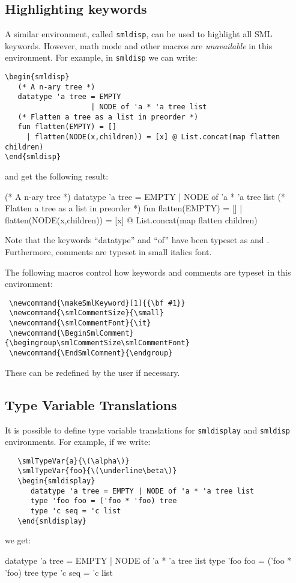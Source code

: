\documentclass{article}
\begin{document}
\subsection{Highlighting keywords}
A similar environment, called \verb|smldisp|, can be used to highlight
all SML keywords.   However, math mode and other macros are {\em unavailable}
in this environment.  For example, in \verb|smldisp| we can write:
\begin{verbatim}
\begin{smldisp} 
   (* A n-ary tree *)
   datatype 'a tree = EMPTY 
                    | NODE of 'a * 'a tree list
   (* Flatten a tree as a list in preorder *)
   fun flatten(EMPTY) = []
     | flatten(NODE(x,children)) = [x] @ List.concat(map flatten children)
\end{smldisp}
\end{verbatim}
and get the following result:
\begin{smldisp} 
   (* A n-ary tree *)
   datatype 'a tree = EMPTY 
                    | NODE of 'a * 'a tree list
   (* Flatten a tree as a list in preorder *)
   fun flatten(EMPTY) = []
     | flatten(NODE(x,children)) = [x] @ List.concat(map flatten children)
\end{smldisp}

Note that the keywords ``datatype'' and ``of'' have been typeset as
 and .  Furthermore, comments are typeset
in small italics font.   

The following macros control how keywords and comments are typeset
in this environment:
\begin{verbatim}
 \newcommand{\makeSmlKeyword}[1]{{\bf #1}}
 \newcommand{\smlCommentSize}{\small}
 \newcommand{\smlCommentFont}{\it}
 \newcommand{\BeginSmlComment}{\begingroup\smlCommentSize\smlCommentFont}
 \newcommand{\EndSmlComment}{\endgroup}
\end{verbatim}
These can be redefined by the user if necessary.

\subsection{Type Variable Translations}
It is possible to define type variable translations for
\verb|smldisplay| and \verb|smldisp| environments.  For example, 
if we write:
\begin{verbatim}
   \smlTypeVar{a}{\(\alpha\)}
   \smlTypeVar{foo}{\(\underline\beta\)}
   \begin{smldisplay} 
      datatype 'a tree = EMPTY | NODE of 'a * 'a tree list
      type 'foo foo = ('foo * 'foo) tree
      type 'c seq = 'c list
   \end{smldisplay}
\end{verbatim}
we get:
   \begin{smldisplay} 
      datatype 'a tree = EMPTY | NODE of 'a * 'a tree list
      type 'foo foo = ('foo * 'foo) tree
      type 'c seq = 'c list
   \end{smldisplay}
\end{document}
